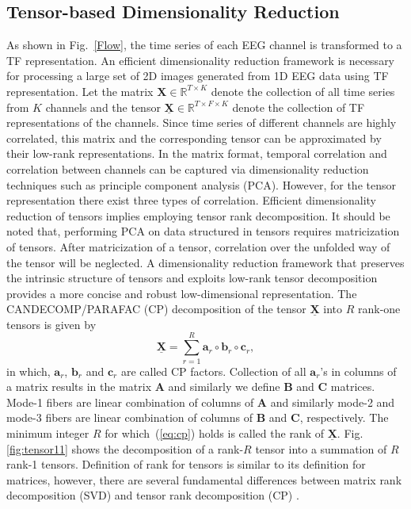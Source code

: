 \documentclass{article}
\begin{document}
\subsection{Tensor-based Dimensionality Reduction}
\vspace{-1pt}
As shown in Fig.~\ref{Flow}, the time series of each EEG channel is transformed to a TF representation.
An efficient dimensionality reduction framework is necessary for processing a large set of 2D images generated from 1D EEG data using TF representation.
Let the matrix $\boldsymbol{X}\in \mathbb{R}^{T\times K}$ denote the collection of all time series from $K$ channels and the tensor $\underline{\boldsymbol{X}}\in \mathbb{R}^{T\times F \times K}$ denote the collection of TF representations of the channels. Since time series of different channels are highly correlated, this matrix and the corresponding tensor can be approximated by their low-rank representations. 
In the matrix format, temporal correlation and correlation between channels can be captured via dimensionality reduction techniques such as principle component analysis (PCA). However, for the tensor representation there exist three types of correlation. Efficient dimensionality reduction of tensors implies employing tensor rank decomposition. It should be noted that, performing PCA  on data structured in tensors requires matricization of tensors. After matricization of a tensor, correlation over the unfolded way of the tensor will be neglected. A dimensionality reduction framework that preserves the intrinsic structure of tensors and exploits low-rank tensor decomposition provides a more concise and robust low-dimensional representation. The CANDECOMP/PARAFAC (CP) decomposition of the tensor $\underline{\boldsymbol{X}}$ into $R$ rank-one tensors is given by
\begin{equation}
\label{eq:cp}
    \underline{\boldsymbol{X}}=\sum_{r=1}^R \boldsymbol{a}_r\circ \boldsymbol{b}_r \circ \boldsymbol{c}_r,
\end{equation}
in which, $\boldsymbol{a}_r$, $\boldsymbol{b}_r$ and $\boldsymbol{c}_r$ are called CP factors. Collection of all $\boldsymbol{a}_r$'s in columns of a matrix results in the matrix $\boldsymbol{A}$ and similarly we define $\boldsymbol{B}$ and $\boldsymbol{C}$ matrices. Mode-1 fibers are linear combination of columns of $\boldsymbol{A}$ and similarly mode-2 and mode-3 fibers are linear combination of columns of $\boldsymbol{B}$ and $\boldsymbol{C}$, respectively. The minimum integer $R$ for which~(\ref{eq:cp}) holds is called the rank of $\underline{\boldsymbol{X}}$. Fig. \ref{fig:tensor11} shows the decomposition of a rank-$R$ tensor into a summation of $R$ rank-1 tensors. Definition of rank for tensors is similar to its definition for matrices, however, there are several fundamental differences between matrix rank decomposition (SVD) and tensor rank decomposition (CP) \cite{kolda}.
\end{document}
